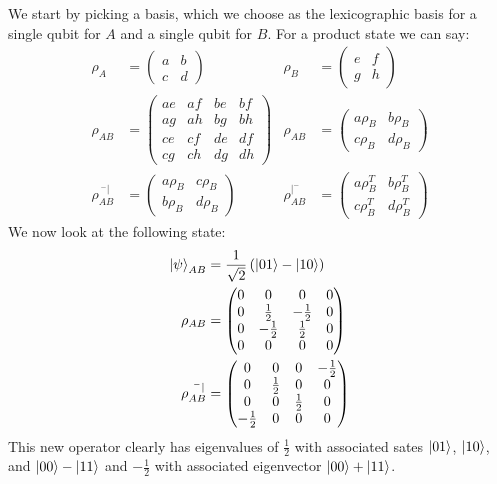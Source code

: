We start by picking a basis, which we choose as the lexicographic basis for a single qubit for $A$ and a single qubit for $B$. For a product state we can say:
\begin{align*}
	\rho_A &= \begin{pmatrix}
		a & b \\
		c & d
	\end{pmatrix} &
	\rho_B &= \begin{pmatrix}
		e & f \\
		g & h
		  \end{pmatrix} \\
	\rho_{AB} &= \begin{pmatrix}
		ae & af & be & bf \\
		ag & ah & bg & bh \\
		ce & cf & de & df \\
		cg & ch & dg & dh
	\end{pmatrix} &
	\rho_{AB} &= \begin{pmatrix}
		a\rho_B & b\rho_B \\
		c\rho_B & d\rho_B
		     \end{pmatrix} \\
	\rho_{AB}^{\ ^-|} &= \begin{pmatrix}
		a\rho_B & c\rho_B \\
		b\rho_B & d\rho_B
	\end{pmatrix} &
	\rho_{AB}^{|^-} &= \begin{pmatrix}
		a\rho_B^T & b\rho_B^T \\
		c\rho_B^T & d\rho_B^T
			   \end{pmatrix}
\end{align*}
We now look at the following state:
\begin{align*}
	\ket{\psi}_{AB} &= \frac{1}{\sqrt{2}}\left(\ket{01} - \ket{10}\right) \\
	\rho_{AB} &= \begin{pmatrix}
		0 & 0 & 0 & 0 \\
		0 & \frac{1}{2} & -\frac{1}{2} & 0 \\
		0 & -\frac{1}{2} & \frac{1}{2} & 0 \\
		0 & 0 & 0 & 0
		     \end{pmatrix} \\
	\rho_{AB}^{\ ^-|} &= \begin{pmatrix}
		0 & 0 & 0 & -\frac{1}{2} \\
		0 & \frac{1}{2} & 0 & 0 \\
		0 & 0 & \frac{1}{2} & 0 \\
		-\frac{1}{2} & 0 & 0 & 0
			     \end{pmatrix}
\end{align*}
This new operator clearly has eigenvalues of $\frac{1}{2}$ with associated sates $\ket{01}$, $\ket{10}$, and $\ket{00} - \ket{11}$ and $-\frac{1}{2}$ with associated eigenvector $\ket{00} + \ket{11}$.

